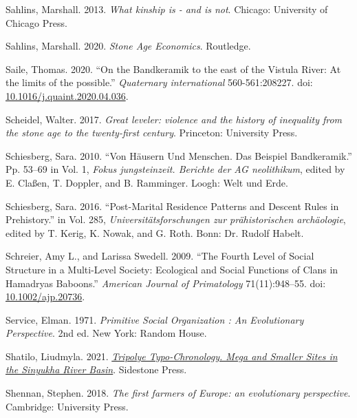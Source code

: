 \documentclass[
  12pt,
]{book}
\newlength{\cslhangindent}
\newlength{\cslentryspacingunit} %
\newenvironment{CSLReferences}[2] %
 {%
  \setlength{\parindent}{0pt}
  \ifodd #1
  \let\oldpar\par
  \def\par{\hangindent=\cslhangindent\oldpar}
  \fi
  \setlength{\parskip}{#2\cslentryspacingunit}
 }%
 {}
\begin{document}
\begin{CSLReferences}{1}{0}
\leavevmode{}%
Sahlins, Marshall. 2013. \emph{What kinship is - and is not}. Chicago: University of Chicago Press.

\leavevmode{}%
Sahlins, Marshall. 2020. \emph{Stone Age Economics}. Routledge.

\leavevmode{}%
Saile, Thomas. 2020. {``On the Bandkeramik to the east of the Vistula River: At the limits of the possible.''} \emph{Quaternary international} 560-561:208227. doi: \href{https://doi.org/10.1016/j.quaint.2020.04.036}{10.1016/j.quaint.2020.04.036}.

\leavevmode{}%
Scheidel, Walter. 2017. \emph{Great leveler: violence and the history of inequality from the stone age to the twenty-first century}. Princeton: University Press.

\leavevmode{}%
Schiesberg, Sara. 2010. {``Von Häusern Und Menschen. Das Beispiel Bandkeramik.''} Pp. 53--69 in Vol. 1, \emph{Fokus jungsteinzeit. Berichte der AG neolithikum}, edited by E. Claßen, T. Doppler, and B. Ramminger. Loogh: Welt und Erde.

\leavevmode{}%
Schiesberg, Sara. 2016. {``Post-Marital Residence Patterns and Descent Rules in Prehistory.''} in Vol. 285, \emph{Universitätsforschungen zur prähistorischen archäologie}, edited by T. Kerig, K. Nowak, and G. Roth. Bonn: Dr. Rudolf Habelt.

\leavevmode{}%
Schreier, Amy L., and Larissa Swedell. 2009. {``The Fourth Level of Social Structure in a Multi-Level Society: Ecological and Social Functions of Clans in Hamadryas Baboons.''} \emph{American Journal of Primatology} 71(11):948--55. doi: \href{https://doi.org/10.1002/ajp.20736}{10.1002/ajp.20736}.

\leavevmode{}%
Service, Elman. 1971. \emph{Primitive Social Organization : An Evolutionary Perspective}. 2nd ed. New York: Random House.

\leavevmode{}%
Shatilo, Liudmyla. 2021. \emph{\href{https://library.oapen.org/handle/20.500.12657/50807}{Tripolye Typo-Chronology. Mega and Smaller Sites in the Sinyukha River Basin}}. Sidestone Press.

\leavevmode{}%
Shennan, Stephen. 2018. \emph{The first farmers of Europe: an evolutionary perspective}. Cambridge: University Press.


\end{CSLReferences}
\end{document}
